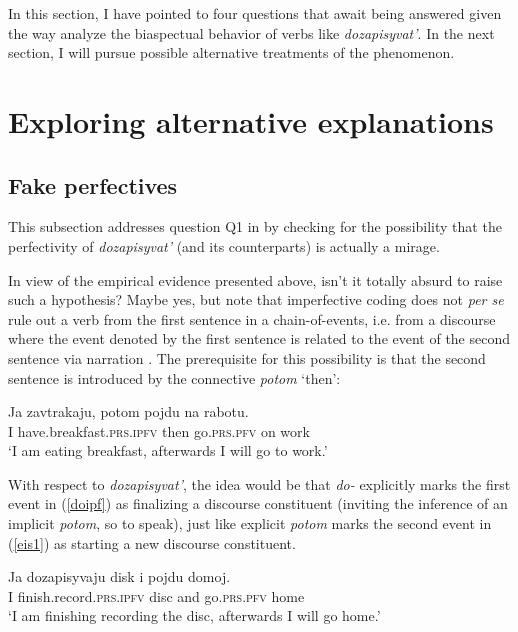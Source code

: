 \documentclass[output=paper,
colorlinks,
citecolor=brown,
newtxmath
]{langscibook}
\begin{document}
\noindent In this section, I have pointed to four questions that await being answered given the way \citet{Zinova.Filip2015} analyze the biaspectual behavior of verbs like \textit{dozapisyvat'}.
In the next section, I will pursue possible alternative treatments of the phenomenon.


\section{Exploring alternative explanations}\label{sec4}

\subsection{Fake perfectives}\label{H2}

This subsection addresses question Q1 in  by checking for the possibility that the perfectivity of \textit{dozapisyvat'} (and its counterparts) is actually a mirage.

In view of the empirical evidence presented above, isn't it totally absurd to raise such a hypothesis? Maybe yes, but note that imperfective coding does not \textit{per se} rule out a verb from the first sentence in a chain-of-events, i.e. from a discourse where the event denoted by the first sentence is related to the event of the second sentence via narration \citep[31]{Zinova2016}. The prerequisite for this possibility is that the second sentence is introduced by the connective \textit{potom} `then':

\ea\label{eis1}
\gll Ja zavtrakaju, potom pojdu na rabotu.\\
I {have.breakfast.}\textsc{prs.ipfv} then go.\textsc{prs.pfv} on work\\
\glt `I am eating breakfast, afterwards I will go to work.'
\z

\noindent With respect to \textit{dozapisyvat'}, the idea would be that \textit{do-}
explicitly marks the first event in (\ref{doipf}) as finalizing a discourse constituent (inviting the inference of an implicit \textit{potom}, so to speak), just like explicit \textit{potom} marks the second event in (\ref{eis1}) as starting a new discourse constituent.

\ea\label{doipf}
\gll Ja dozapisyvaju disk i pojdu domoj.\\
I {finish.record.}\textsc{prs.ipfv} disc and go.\textsc{prs.pfv} home\\
\glt`I am finishing recording the disc, afterwards I will go home.'
\z
\end{document}
